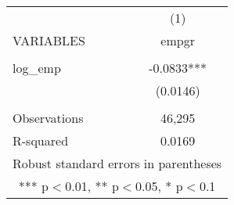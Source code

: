 \documentclass[]{article}
\begin{document}
\begin{tabular}{lc} \hline
 & (1) \\
VARIABLES & empgr \\ \hline
 &  \\
log\_emp & -0.0833*** \\
 & (0.0146) \\
 &  \\
Observations & 46,295 \\
 R-squared & 0.0169 \\ \hline
\multicolumn{2}{c}{ Robust standard errors in parentheses} \\
\multicolumn{2}{c}{ *** p$<$0.01, ** p$<$0.05, * p$<$0.1} \\
\end{tabular}
\end{document}
